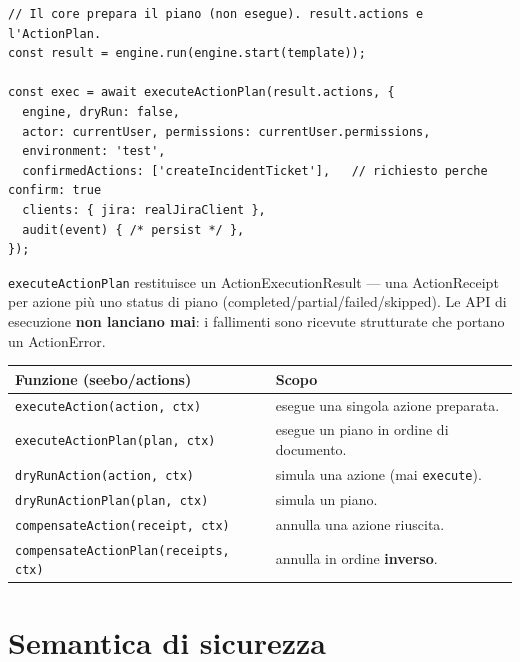 \documentclass[11pt,a4paper]{book}
\let\code\lstinline
\newcommand{\ic}[1]{{\ttfamily #1}}
\theoremstyle{definition}
\begin{document}
{{{{\begin{lstlisting}
// Il core prepara il piano (non esegue). result.actions e l'ActionPlan.
const result = engine.run(engine.start(template));

const exec = await executeActionPlan(result.actions, {
  engine, dryRun: false,
  actor: currentUser, permissions: currentUser.permissions,
  environment: 'test',
  confirmedActions: ['createIncidentTicket'],   // richiesto perche confirm: true
  clients: { jira: realJiraClient },
  audit(event) { /* persist */ },
});
\end{lstlisting}

\code|executeActionPlan| restituisce un \ic{ActionExecutionResult} --- una
\ic{ActionReceipt} per azione più uno \ic{status} di piano
(\ic{completed}/\ic{partial}/\ic{failed}/\ic{skipped}). Le API di esecuzione
\textbf{non lanciano mai}: i fallimenti sono ricevute strutturate che portano un
\ic{ActionError}.

\begin{center}
\small
\begin{tabular}{@{}l p{8.8cm}@{}}
\toprule
\textbf{Funzione (\ic{seebo/actions})} & \textbf{Scopo} \\
\midrule
\code|executeAction(action, ctx)| & esegue una singola azione preparata. \\
\code|executeActionPlan(plan, ctx)| & esegue un piano in ordine di documento. \\
\code|dryRunAction(action, ctx)| & simula una azione (mai \code|execute|). \\
\code|dryRunActionPlan(plan, ctx)| & simula un piano. \\
\code|compensateAction(receipt, ctx)| & annulla una azione riuscita. \\
\code|compensateActionPlan(receipts, ctx)| & annulla in ordine \textbf{inverso}. \\
\bottomrule
\end{tabular}
\end{center}

\section{Semantica di sicurezza}

}}}}
\end{document}
